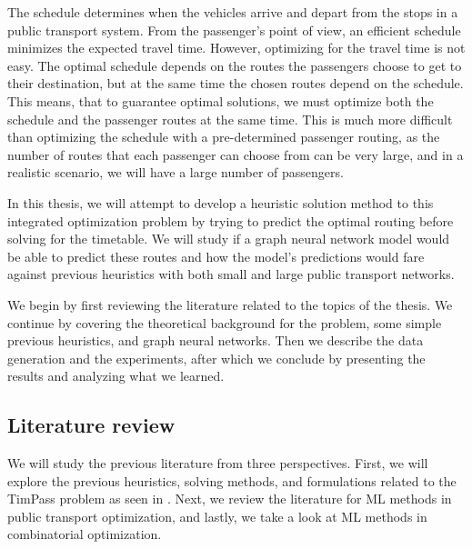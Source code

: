\documentclass[english, 12pt, a4paper, sci, utf8, a-2b, online]{aaltothesis}
\begin{document}

The schedule determines when the vehicles arrive and depart from the stops in a public transport system. From the passenger's point of view, an efficient schedule minimizes the expected travel time. However, optimizing for the travel time is not easy. The optimal schedule depends on the routes the passengers choose to get to their destination, but at the same time the chosen routes depend on the schedule. This means, that to guarantee optimal solutions, we must optimize both the schedule and the passenger routes at the same time. This is much more difficult than optimizing the schedule with a pre-determined passenger routing, as the number of routes that each passenger can choose from can be very large, and in a realistic scenario, we will have a large number of passengers.

In this thesis, we will attempt to develop a heuristic solution method to this integrated optimization problem by trying to predict the optimal routing before solving for the timetable. We will study if a graph neural network model would be able to predict these routes and how the model's predictions would fare against previous heuristics with both small and large public transport networks.

We begin by first reviewing the literature related to the topics of the thesis. We continue by covering the theoretical background for the problem, some simple previous heuristics, and graph neural networks. Then we describe the data generation and the experiments, after which we conclude by presenting the results and analyzing what we learned.

\subsection{Literature review}


We will study the previous literature from three perspectives. First, we will explore the previous heuristics, solving methods, and formulations related to the TimPass problem as seen in \cite{schmidt2014integrating, schiewe2020periodic}. Next, we review the literature for ML methods in public transport optimization, and lastly, we take a look at ML methods in combinatorial optimization.
\end{document}
